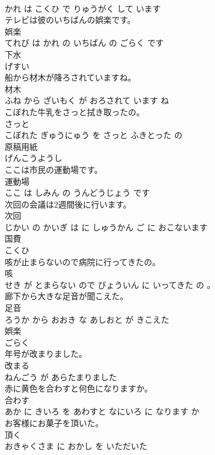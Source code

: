 \documentclass[8pt]{extreport}
\begin{document}
\begin{CJK}{UTF8}{min}
\\	かれ は こくひ で りゅうがく して います			
\\	テレビは彼のいちばんの娯楽です。	
\\	娯楽 
\\	てれび は かれ の いちばん の ごらく です			
\\	下水	
\\	げすい		
\\	船から材木が降ろされていますね。	
\\	材木 
\\	ふね から ざいもく が おろされて います ね			
\\	こぼれた牛乳をさっと拭き取ったの。	
\\	さっと 
\\	こぼれた ぎゅうにゅう を さっと ふきとった の			
\\	原稿用紙	
\\	げんこうようし		
\\	ここは市民の運動場です。	
\\	運動場 
\\	ここ は しみん の うんどうじょう です			
\\	次回の会議は2週間後に行います。	
\\	次回 
\\	じかい の かいぎ は に しゅうかん ご に おこないます			
\\	国費	
\\	こくひ		
\\	咳が止まらないので病院に行ってきたの。	
\\	咳 
\\	せき が とまらない ので びょういん に いってきた の 。			
\\	廊下から大きな足音が聞こえた。	
\\	足音 
\\	ろうか から おおき な あしおと が きこえた			
\\	娯楽	
\\	ごらく		
\\	年号が改まりました。	
\\	改まる 
\\	ねんごう が あらたまりました			
\\	赤に黄色を合わすと何色になりますか。	
\\	合わす 
\\	あか に きいろ を あわすと なにいろ に なります か			
\\	お客様にお菓子を頂いた。	
\\	頂く 
\\	おきゃくさま に おかし を いただいた			

\end{CJK}
\end{document}
